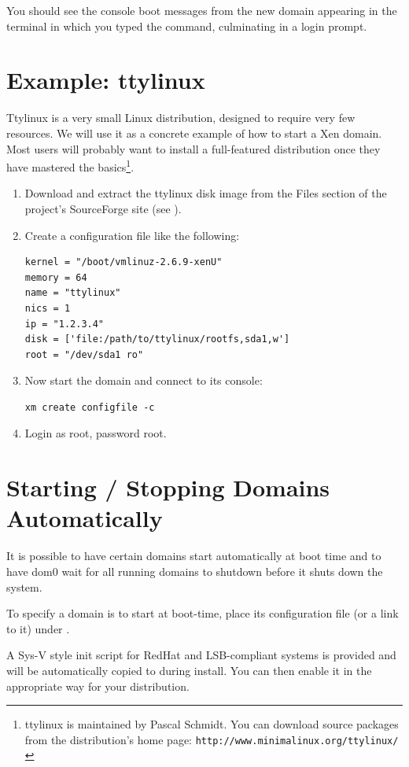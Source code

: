\documentclass[11pt,twoside,final,openright]{report}
\begin{document}
You should see the console boot messages from the new domain 
appearing in the terminal in which you typed the command, 
culminating in a login prompt. 


\section{Example: ttylinux}

Ttylinux is a very small Linux distribution, designed to require very
few resources.  We will use it as a concrete example of how to start a
Xen domain.  Most users will probably want to install a full-featured
distribution once they have mastered the basics\footnote{ttylinux is
maintained by Pascal Schmidt. You can download source packages from
the distribution's home page: {\tt http://www.minimalinux.org/ttylinux/}}.

\begin{enumerate}
\item Download and extract the ttylinux disk image from the Files
section of the project's SourceForge site (see 
).
\item Create a configuration file like the following:
\begin{verbatim}
kernel = "/boot/vmlinuz-2.6.9-xenU"
memory = 64
name = "ttylinux"
nics = 1
ip = "1.2.3.4"
disk = ['file:/path/to/ttylinux/rootfs,sda1,w']
root = "/dev/sda1 ro"
\end{verbatim}
\item Now start the domain and connect to its console:
\begin{verbatim}
xm create configfile -c
\end{verbatim}
\item Login as root, password root.
\end{enumerate}


\section{Starting / Stopping Domains Automatically}

It is possible to have certain domains start automatically at boot
time and to have dom0 wait for all running domains to shutdown before
it shuts down the system.

To specify a domain is to start at boot-time, place its
configuration file (or a link to it) under .

A Sys-V style init script for RedHat and LSB-compliant systems is
provided and will be automatically copied to 
during install.  You can then enable it in the appropriate way for
your distribution.
\end{document}
